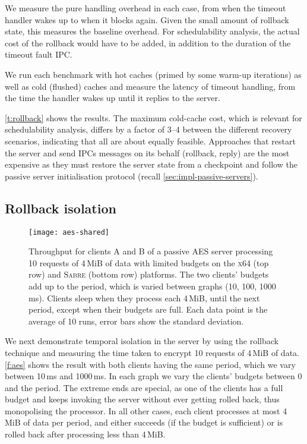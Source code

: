 We measure the pure handling overhead in each case, from when the timeout handler wakes up to when
it blocks again.  Given the small amount of rollback state, this measures the baseline overhead. For
schedulability analysis, the actual cost of the rollback would have to be added, in addition to the
duration of the timeout fault IPC. 
 
We run each benchmark with hot caches (primed by some warm-up
iterations)  as well as cold (flushed) caches and measure the 
latency of timeout handling, from the time the handler wakes up
until it replies to the server.

\autoref{t:rollback} shows the results. The maximum
cold-cache cost, which is relevant for schedulability analysis, differs by a factor of 3--4 between
the different recovery scenarios, indicating that all are about equally feasible.  Approaches that
restart the server and send \glspl{IPC} messages on its behalf (rollback, reply) are the most
expensive as they must restore the server state from a checkpoint and follow the passive server
initialisation protocol (recall \cref{sec:impl-passive-servers}). 

\subsection{Rollback isolation}

\begin{figure}[t]
  \centering
  \texttt{[image: aes-shared]}
  \caption[Results of AES server isolation benchmark.]{Throughput for clients A and B of a passive AES server processing 10 requests of 4\,MiB of data with
      limited budgets on the \textsc{x64} (top row) and \textsc{Sabre} (bottom row) platforms. The two clients' budgets
      add up to the period, which is varied between graphs (10, 100, 1000\,ms). Clients sleep when
      they process each 4\,MiB, until the next period, except when their budgets are full. Each data point is the average of 10 runs, error bars show the standard deviation.}
  \label{f:aes}
\end{figure}

We next demonstrate temporal isolation in the server by using the rollback
technique and measuring the time taken to encrypt 10 requests of 4\,MiB of
data. \autoref{f:aes} shows the result with both clients having the same
period, which we vary between 10\,ms and 1000\,ms.
In each graph we vary the clients' budgets between 0 and the
period. The extreme ends are special, as one of the clients has a full
budget and keeps invoking the server without ever getting rolled back,
thus monopolising the processor. In all other cases, each client
processes at most 4\,MiB of data per period, and either succeeds (if
the budget is sufficient) or is rolled back after processing less than 4\,MiB.

